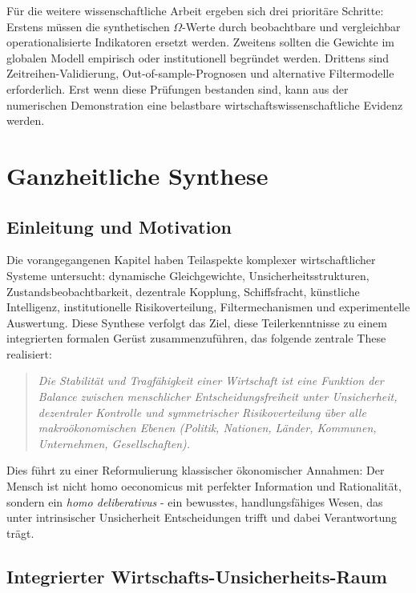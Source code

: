 \documentclass[a4paper, 12pt, twoside, openright]{report}
\theoremstyle{definition}
\theoremstyle{definition}
\begin{document}
Für die weitere wissenschaftliche Arbeit ergeben sich drei prioritäre Schritte:
Erstens müssen die synthetischen $\Omega$-Werte durch beobachtbare und
vergleichbar operationalisierte Indikatoren ersetzt werden. Zweitens sollten
die Gewichte im globalen Modell empirisch oder institutionell begründet werden.
Drittens sind Zeitreihen-Validierung, Out-of-sample-Prognosen und alternative
Filtermodelle erforderlich. Erst wenn diese Prüfungen bestanden sind, kann aus
der numerischen Demonstration eine belastbare wirtschaftswissenschaftliche
Evidenz werden.

\cleardoublepage

\chapter{Ganzheitliche Synthese}
\label{ch:ganzheitliche-synthese}

\section{Einleitung und Motivation}

Die vorangegangenen Kapitel haben Teilaspekte komplexer wirtschaftlicher Systeme untersucht: dynamische Gleichgewichte, Unsicherheitsstrukturen, Zustandsbeobachtbarkeit, dezentrale Kopplung, Schiffsfracht, künstliche Intelligenz, institutionelle Risikoverteilung, Filtermechanismen und experimentelle Auswertung. Diese Synthese verfolgt das Ziel, diese Teilerkenntnisse zu einem integrierten formalen Gerüst zusammenzuführen, das folgende zentrale These realisiert:

\begin{quote}
\textit{Die Stabilität und Tragfähigkeit einer Wirtschaft ist eine Funktion der Balance zwischen menschlicher Entscheidungsfreiheit unter Unsicherheit, dezentraler Kontrolle und symmetrischer Risikoverteilung über alle makroökonomischen Ebenen (Politik, Nationen, Länder, Kommunen, Unternehmen, Gesellschaften).}
\end{quote}

Dies führt zu einer Reformulierung klassischer ökonomischer Annahmen: Der Mensch ist nicht homo oeconomicus mit perfekter Information und Rationalität, sondern ein \emph{homo deliberativus} - ein bewusstes, handlungsfähiges Wesen, das unter intrinsischer Unsicherheit Entscheidungen trifft und dabei Verantwortung trägt.

\section{Integrierter Wirtschafts-Unsicherheits-Raum}
\end{document}
